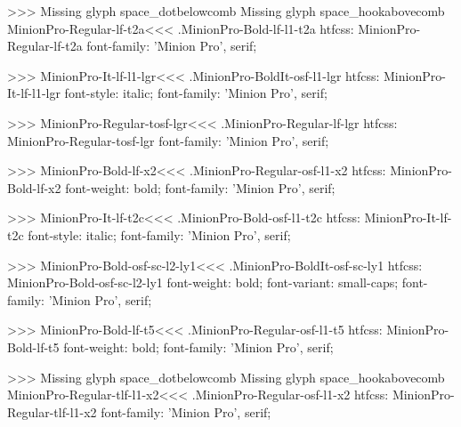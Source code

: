 {>>>
Missing glyph	space_dotbelowcomb
Missing glyph	space_hookabovecomb
\<MinionPro-Regular-lf-t2a\><<<
.MinionPro-Bold-lf-l1-t2a
htfcss:  MinionPro-Regular-lf-t2a  font-family: 'Minion Pro', serif;

>>>
\<MinionPro-It-lf-l1-lgr\><<<
.MinionPro-BoldIt-osf-l1-lgr
htfcss:  MinionPro-It-lf-l1-lgr  font-style: italic; font-family: 'Minion Pro', serif;

>>>
\<MinionPro-Regular-tosf-lgr\><<<
.MinionPro-Regular-lf-lgr
htfcss:  MinionPro-Regular-tosf-lgr  font-family: 'Minion Pro', serif;

>>>
\<MinionPro-Bold-lf-x2\><<<
.MinionPro-Regular-osf-l1-x2
htfcss:  MinionPro-Bold-lf-x2  font-weight: bold; font-family: 'Minion Pro', serif;

>>>
\<MinionPro-It-lf-t2c\><<<
.MinionPro-Bold-osf-l1-t2c
htfcss:  MinionPro-It-lf-t2c  font-style: italic; font-family: 'Minion Pro', serif;

>>>
\<MinionPro-Bold-osf-sc-l2-ly1\><<<
.MinionPro-BoldIt-osf-sc-ly1
htfcss:  MinionPro-Bold-osf-sc-l2-ly1  font-weight: bold; font-variant: small-caps; font-family: 'Minion Pro', serif;

>>>
\<MinionPro-Bold-lf-t5\><<<
.MinionPro-Regular-osf-l1-t5
htfcss:  MinionPro-Bold-lf-t5  font-weight: bold; font-family: 'Minion Pro', serif;

>>>
Missing glyph	space_dotbelowcomb
Missing glyph	space_hookabovecomb
\<MinionPro-Regular-tlf-l1-x2\><<<
.MinionPro-Regular-osf-l1-x2
htfcss:  MinionPro-Regular-tlf-l1-x2  font-family: 'Minion Pro', serif;

}
